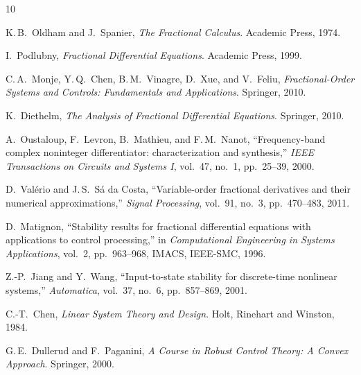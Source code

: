 \documentclass[11pt,a4paper]{article}
\theoremstyle{definition}
\begin{document}
\begin{thebibliography}{10}

K.\,B.\ Oldham and J.\ Spanier,
\textit{The Fractional Calculus}.
Academic Press, 1974.

I.\ Podlubny,
\textit{Fractional Differential Equations}.
Academic Press, 1999.

C.\,A.\ Monje, Y.\,Q.\ Chen, B.\,M.\ Vinagre, D.\ Xue, and V.\ Feliu,
\textit{Fractional-Order Systems and Controls: Fundamentals and Applications}.
Springer, 2010.

K.\ Diethelm,
\textit{The Analysis of Fractional Differential Equations}.
Springer, 2010.

A.\ Oustaloup, F.\ Levron, B.\ Mathieu, and F.\,M.\ Nanot,
``Frequency-band complex noninteger differentiator: characterization and
synthesis,''
\textit{IEEE Transactions on Circuits and Systems I}, vol.~47, no.~1,
pp.~25--39, 2000.

D.\ Valério and J.\,S.\ Sá da Costa,
``Variable-order fractional derivatives and their numerical approximations,''
\textit{Signal Processing}, vol.~91, no.~3, pp.~470--483, 2011.

D.\ Matignon,
``Stability results for fractional differential equations with applications
to control processing,''
in \textit{Computational Engineering in Systems Applications}, vol.~2,
pp.~963--968, IMACS, IEEE-SMC, 1996.

Z.-P.\ Jiang and Y.\ Wang,
``Input-to-state stability for discrete-time nonlinear systems,''
\textit{Automatica}, vol.~37, no.~6, pp.~857--869, 2001.

C.-T.\ Chen,
\textit{Linear System Theory and Design}.
Holt, Rinehart and Winston, 1984.

G.\,E.\ Dullerud and F.\ Paganini,
\textit{A Course in Robust Control Theory: A Convex Approach}.
Springer, 2000.

\end{thebibliography}
\end{document}
